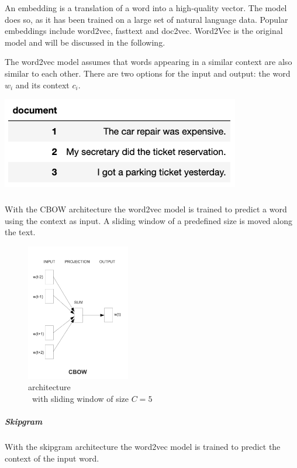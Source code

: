             An embedding is a translation of a word into a high-quality vector. The model does so, as it has been trained on a large set of natural language data. Popular embeddings include word2vec, fasttext and doc2vec. Word2Vec is the original model and will be discussed in the following. 
            
            The word2vec model assumes that words appearing in a similar context are also similar to each other. There are two options for the input and output: the word $w_i$ and its context $c_i$.
            
            \includegraphics[height=4cm]{Bilder/word2vec/documents.png}
            
            \subparagraph{} 
            With the \ac{CBOW} architecture the word2vec model is trained to predict a word using the context as input. A sliding window of a predefined size is moved along the text. 
            
            \begin{figure}[ht]
                \centering
                \includegraphics[height=6cm]{Bilder/word2vec/architecture_cbow.png}
                \caption{ architecture\\\ with sliding window of size $C=5$ }
                \label{fig:cbow-architecture}
            \end{figure}
        
            \subparagraph{Skipgram} 
            With the skipgram architecture the word2vec model is trained to predict the context of the input word.
            
